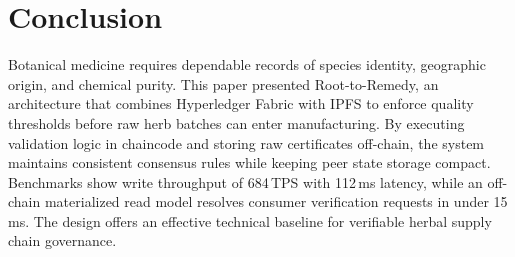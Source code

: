 \documentclass[conference]{IEEEtran}
\begin{document}
\section{Conclusion}
Botanical medicine requires dependable records of species identity, geographic origin, and chemical purity. This paper presented Root-to-Remedy, an architecture that combines Hyperledger Fabric with IPFS to enforce quality thresholds before raw herb batches can enter manufacturing. By executing validation logic in chaincode and storing raw certificates off-chain, the system maintains consistent consensus rules while keeping peer state storage compact. Benchmarks show write throughput of 684\,TPS with 112\,ms latency, while an off-chain materialized read model resolves consumer verification requests in under 15\,ms. The design offers an effective technical baseline for verifiable herbal supply chain governance.



\end{document}
